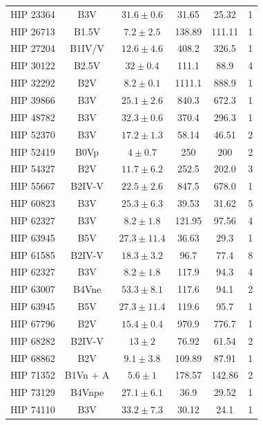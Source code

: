 {\begin{small}
\begin{longtable}{|cccccc|}
        HIP 23364 & B3V &$ 31.6 \pm 0.6 $& 31.65 & 25.32 & 1 \\ 
        HIP 26713 & B1.5V &$ 7.2 \pm 2.5 $& 138.89 & 111.11 & 1 \\ 
        HIP 27204 & B1IV/V & $12.6 \pm 4.6$ & 408.2 & 326.5 & 1 \\
    HIP 30122 & B2.5V & $32 \pm 0.4$ & 111.1 & 88.9 & 4 \\
    HIP 32292 & B2V & $8.2 \pm 0.1$ & 1111.1 & 888.9 & 1 \\
    HIP 39866 & B3V & $25.1 \pm 2.6$ & 840.3 & 672.3 & 1 \\
    HIP 48782 & B3V & $32.3 \pm 0.6$ & 370.4 & 296.3 & 1 \\
        HIP 52370 & B3V &$ 17.2 \pm 1.3 $& 58.14 & 46.51 & 2 \\ 
        HIP 52419 & B0Vp &$ 4 \pm 0.7 $& 250 & 200 & 2 \\ 
    HIP 54327 & B2V & $11.7 \pm 6.2$ & 252.5 & 202.0 & 3 \\
    HIP 55667 & B2IV-V & $22.5 \pm 2.6$ & 847.5 & 678.0 & 1 \\
        HIP 60823 & B3V &$ 25.3 \pm 6.3 $& 39.53 & 31.62 & 5 \\ 
        HIP 62327 & B3V &$ 8.2 \pm 1.8 $& 121.95 & 97.56 & 4 \\
        HIP 63945 & B5V &$ 27.3 \pm 11.4 $& 36.63 & 29.3 & 1 \\  
    HIP 61585 & B2IV-V & $18.3 \pm 3.2$ & 96.7 & 77.4 & 8 \\
    HIP 62327 & B3V & $8.2 \pm 1.8$ & 117.9 & 94.3 & 4 \\
    HIP 63007 & B4Vne & $53.3 \pm 8.1$ & 117.6 & 94.1 & 2 \\
    HIP 63945 & B5V & $27.3 \pm 11.4$ & 119.6 & 95.7 & 1 \\
    HIP 67796 & B2V & $15.4 \pm 0.4$ & 970.9 & 776.7 & 1 \\
        HIP 68282 & B2IV-V &$ 13 \pm 2 $& 76.92 & 61.54 & 2\\ 
        HIP 68862 & B2V &$ 9.1 \pm 3.8 $& 109.89 & 87.91 & 1 \\ 
        HIP 71352 & B1Vn + A &$ 5.6 \pm 1 $& 178.57 & 142.86 & 2 \\ 
        HIP 73129 & B4Vnpe &$ 27.1 \pm 6.1 $& 36.9 & 29.52 & 1 \\ 
        HIP 74110 & B3V &$ 33.2 \pm 7.3 $& 30.12 & 24.1 & 1 \\ 

\end{longtable}
\end{small}}
